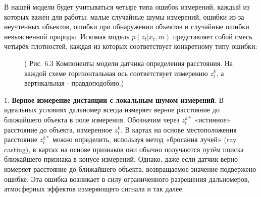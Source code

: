 \documentclass[10pt,a4paper]{article}
\begin{document}
В нашей модели будет учитываться четыре типа ошибок измерений, каждый из которых важен для работы: малые случайные шумы измерений, ошибки из-за неучтенных объектов, ошибки при обнаружении объектов и случайные ошибки невыясненной природы. Искомая модель $p(z_t | x_t, m)$ представляет собой смесь четырёх плотностей, каждая из которых соответствует конкретному типу ошибки:\\
 
\begin{figure}[H]
	\caption{ (  Рис. 6.3 Компоненты модели датчика определения расстояния. На каждой схеме горизонтальная ось соответствует измерению $z_t^k$, а вертикальная - правдоподобию.)}
	\label{fig:63orig}
\end{figure}

1. \textbf{Верное измерение дистанции с локальным шумом измерений}. В идеальных условиях дальномер всегда измеряет верное расстояние до ближайшего объекта в поле измерения. Обозначим через $z^{k*}_t$ «истинное» расстояние до объекта, измеренное $z_t^k$. В картах на основе местоположения расстояние $z_t^{k*}$ можно определить, используя метод «бросания лучей» (ray casting), в картах на основе признаков они обычно получаются путём поиска ближайшего признака в конусе измерений. Однако, даже если датчик верно измеряет расстояние до ближайшего объекта, возвращаемое значение подвержено ошибке. Эта ошибка возникает в силу ограниченного разрешения дальномеров, атмосферных эффектов измеряющего сигнала и так далее.  
\end{document}
